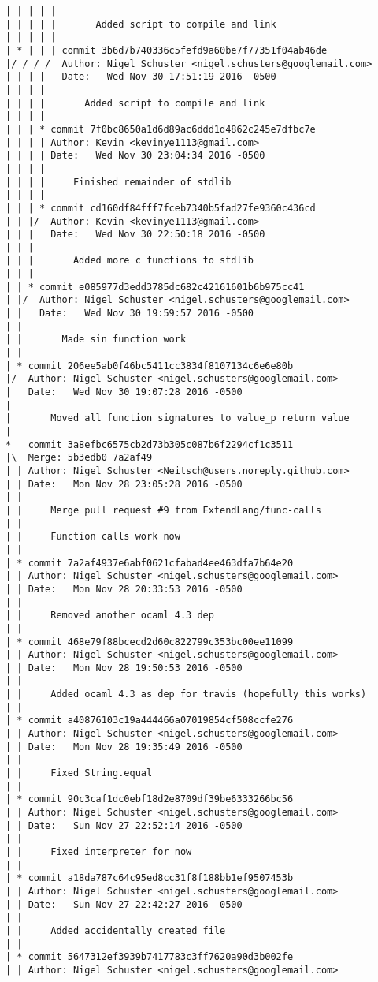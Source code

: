 \begin{lstlisting}
| | | | |       
| | | | |       Added script to compile and link
| | | | |      
| * | | | commit 3b6d7b740336c5fefd9a60be7f77351f04ab46de
|/ / / /  Author: Nigel Schuster <nigel.schusters@googlemail.com>
| | | |   Date:   Wed Nov 30 17:51:19 2016 -0500
| | | |   
| | | |       Added script to compile and link
| | | |     
| | | * commit 7f0bc8650a1d6d89ac6ddd1d4862c245e7dfbc7e
| | | | Author: Kevin <kevinye1113@gmail.com>
| | | | Date:   Wed Nov 30 23:04:34 2016 -0500
| | | | 
| | | |     Finished remainder of stdlib
| | | |     
| | | * commit cd160df84fff7fceb7340b5fad27fe9360c436cd
| | |/  Author: Kevin <kevinye1113@gmail.com>
| | |   Date:   Wed Nov 30 22:50:18 2016 -0500
| | |   
| | |       Added more c functions to stdlib
| | |    
| | * commit e085977d3edd3785dc682c42161601b6b975cc41
| |/  Author: Nigel Schuster <nigel.schusters@googlemail.com>
| |   Date:   Wed Nov 30 19:59:57 2016 -0500
| |   
| |       Made sin function work
| |   
| * commit 206ee5ab0f46bc5411cc3834f8107134c6e6e80b
|/  Author: Nigel Schuster <nigel.schusters@googlemail.com>
|   Date:   Wed Nov 30 19:07:28 2016 -0500
|   
|       Moved all function signatures to value_p return value
|    
*   commit 3a8efbc6575cb2d73b305c087b6f2294cf1c3511
|\  Merge: 5b3edb0 7a2af49
| | Author: Nigel Schuster <Neitsch@users.noreply.github.com>
| | Date:   Mon Nov 28 23:05:28 2016 -0500
| | 
| |     Merge pull request #9 from ExtendLang/func-calls
| |     
| |     Function calls work now
| |   
| * commit 7a2af4937e6abf0621cfabad4ee463dfa7b64e20
| | Author: Nigel Schuster <nigel.schusters@googlemail.com>
| | Date:   Mon Nov 28 20:33:53 2016 -0500
| | 
| |     Removed another ocaml 4.3 dep
| |   
| * commit 468e79f88bcecd2d60c822799c353bc00ee11099
| | Author: Nigel Schuster <nigel.schusters@googlemail.com>
| | Date:   Mon Nov 28 19:50:53 2016 -0500
| | 
| |     Added ocaml 4.3 as dep for travis (hopefully this works)
| |   
| * commit a40876103c19a444466a07019854cf508ccfe276
| | Author: Nigel Schuster <nigel.schusters@googlemail.com>
| | Date:   Mon Nov 28 19:35:49 2016 -0500
| | 
| |     Fixed String.equal
| |   
| * commit 90c3caf1dc0ebf18d2e8709df39be6333266bc56
| | Author: Nigel Schuster <nigel.schusters@googlemail.com>
| | Date:   Sun Nov 27 22:52:14 2016 -0500
| | 
| |     Fixed interpreter for now
| |   
| * commit a18da787c64c95ed8cc31f8f188bb1ef9507453b
| | Author: Nigel Schuster <nigel.schusters@googlemail.com>
| | Date:   Sun Nov 27 22:42:27 2016 -0500
| | 
| |     Added accidentally created file
| |   
| * commit 5647312ef3939b7417783c3ff7620a90d3b002fe
| | Author: Nigel Schuster <nigel.schusters@googlemail.com>

\end{lstlisting}
